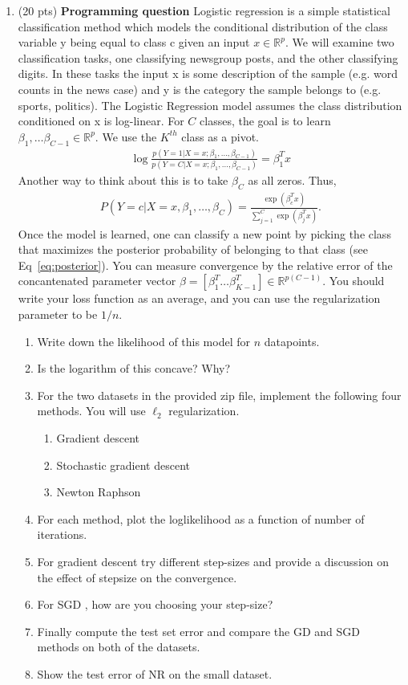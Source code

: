\documentclass[11pt]{article}
\newcommand{\bi}{\begin{enumerate}}
\newcommand{\ib}{\end{enumerate}}
\newcommand{\p}{\item}
\begin{document}
\begin{enumerate}
\item (20 pts) \textbf{Programming question} 
Logistic regression is a simple statistical classification method which models the conditional
distribution of the class variable y being equal to class c given an input $x\in \mathbb{R}^p$.
 We will  examine two classification tasks, one classifying newsgroup posts, and the other classifying digits. In these tasks the input x is some description of the sample (e.g. word counts in the news case) and y is the category the sample belongs to (e.g. sports, politics). The Logistic Regression model assumes the class distribution conditioned on x is log-linear. For $C$ classes, the goal is to learn $\beta_1,\dots \beta_{C-1}\in \mathbb{R}^p$. We use the $K^{th}$ class as a pivot.
 \begin{align*}
 \log \frac{p(Y=1|X=x;\beta_{1},\dots,\beta_{C-1})}{p(Y=C|X=x;\beta_{1},\dots,\beta_{C-1})}=\beta_1^T x
 \end{align*}
 Another way to think about this is to take $\beta_C$ as all zeros. Thus,
 \begin{align}\label{eq:posterior}
 P(Y=c|X=x,\beta_{1},\dots,\beta_{C})=\frac{\exp(\beta_c^T x)}{\sum_{j=1}^C\exp(\beta_j^Tx)}.
 \end{align}
 Once the model is learned, one can classify a new point by picking the class that maximizes the posterior probability of belonging to that class (see Eq~\ref{eq:posterior}). You can measure convergence by the relative error of the concantenated parameter vector $\beta=[\beta_1^T \dots \beta_{K-1}^T]\in\mathbb{R}^{p(C-1)}$. You should write your loss function as an average, and you can use the regularization parameter to be $1/n$.
 \bi
 \p Write down the likelihood of this model for $n$ datapoints.
 \p [Extra credit] Is the logarithm of this concave? Why? 
 \p For the two datasets in the provided zip file, implement the following four methods. You will use $\ell_2$ regularization.
\bi
\p Gradient descent
\p Stochastic gradient descent
\p Newton Raphson
\ib
\p For each method, plot the loglikelihood as a function of number of iterations.
\p For gradient descent  try different step-sizes and provide a discussion on the effect of stepsize on the convergence.
\p For SGD , how are you choosing your step-size? 
\p Finally compute the test set error and compare the GD and SGD methods on both of the datasets.
\p Show the test error of NR on the small dataset. 
 \ib
\end{enumerate}
\end{document}
